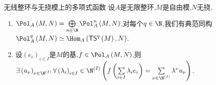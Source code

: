 \begin{corollary}{无线整环与无挠模上的多项式函数}{}
	设$A$是无限整环,$M$是自由模,$N$无挠.
	\begin{enumerate}
		\item $\Pol_{A}\left(M,N\right)=\bigoplus\limits_{n\in\N}\Pol_{A}^{n}\left(M,N\right)$,对每个$q\in\N$,我们有典范同构$\Pol_{A}^{q}\left(M,N\right)\simeq\Hom_{A}\left(\mathsf{TS}^{q}\left(M\right),N\right)$.
		\item 设$\left(e_{i}\right)_{i\in I}$是$M$的基,$f\in\Pol_{A}\left(M,N\right)$,则$\exists\left(u_{\nu}\right)_{\nu\in\N^{\left(I\right)}}\forall\left(\lambda_{i}\right)_{i\in I}\in\N^{\left(I\right)}\left(f\left(\sum\limits_{i\in I}\lambda_{i}e_{i}\right)=\sum\limits_{\nu\in\N^{\left(I\right)}}\lambda^{\nu}u_{\nu}\right)$.
	\end{enumerate}
\end{corollary}




































